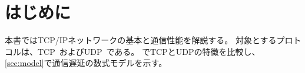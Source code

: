 
\section{はじめに}
\label{sec:intro}

本書ではTCP/IPネットワークの基本と通信性能を解説する。
対象とするプロトコルは、TCP~\cite{rfc9293}およびUDP~\cite{rfc768}である。
でTCPとUDPの特徴を比較し、
\cref{sec:model}で通信遅延の数式モデルを示す。
